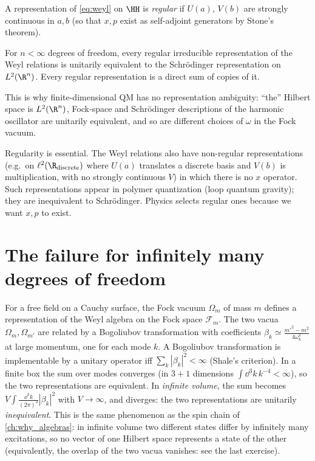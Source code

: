 A representation of \eqref{eq:weyl} on $\HH$ is \emph{regular} if $U(a)$, $V(b)$ are strongly continuous in $a,b$ (so that $x,p$ exist as self-adjoint generators by Stone's theorem).

\begin{theorem}
For $n<\infty$ degrees of freedom, every regular irreducible representation of the Weyl relations is unitarily equivalent to the Schr\"odinger representation on $L^2(\R^n)$. Every regular representation is a direct sum of copies of it.
\end{theorem}

This is why finite-dimensional QM has no representation ambiguity: ``the'' Hilbert space is $L^2(\R^n)$, Fock-space and Schr\"odinger descriptions of the harmonic oscillator are unitarily equivalent, and so are different choices of $\omega$ in the Fock vacuum.

\begin{whatwrong}
Regularity is essential. The Weyl relations also have non-regular representations (e.g.\ on $\ell^2(\R_{\rm discrete})$ where $U(a)$ translates a discrete basis and $V(b)$ is multiplication, with no strongly continuous $V$) in which there is no $x$ operator. Such representations appear in polymer quantization (loop quantum gravity); they are inequivalent to Schr\"odinger. Physics selects regular ones because we want $x,p$ to exist.
\end{whatwrong}

\section{The failure for infinitely many degrees of freedom}

For a free field on a Cauchy surface, the Fock vacuum $\Omega_m$ of mass $m$ defines a representation of the Weyl algebra on the Fock space $\mathcal F_m$. The two vacua $\Omega_m,\Omega_{m'}$ are related by a Bogoliubov transformation with coefficients $\beta_k\simeq\frac{m'^2-m^2}{4\omega_k^{2}}$ at large momentum, one for each mode $k$. A Bogoliubov transformation is implementable by a unitary operator iff $\sum_k|\beta_k|^2<\infty$ (Shale's criterion). In a finite box the sum over modes converges (in $3+1$ dimensions $\int\dd^3k\,k^{-4}<\infty$), so the two representations are equivalent. In \emph{infinite volume}, the sum becomes $V\int\frac{\dd^3k}{(2\pi)^3}|\beta_k|^2$ with $V\to\infty$, and diverges: the two representations are unitarily \emph{inequivalent}. This is the same phenomenon as the spin chain of \cref{ch:why_algebras}: in infinite volume two different states differ by infinitely many excitations, so no vector of one Hilbert space represents a state of the other (equivalently, the overlap of the two vacua vanishes: see the last exercise).

